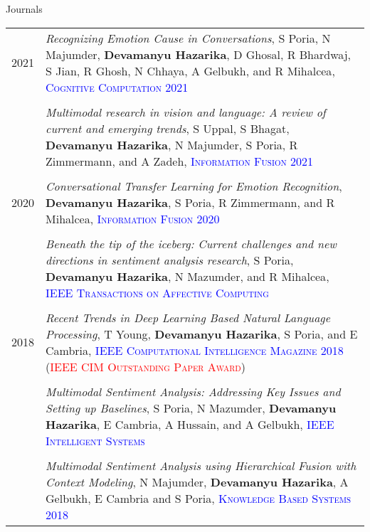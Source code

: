 \documentclass[a4paper,10pt]{article}
\begin{document}
Journals

\begin{tabular}{R{1cm}| L{12cm}}

    2021 & \textit{Recognizing Emotion Cause in Conversations}, \small{S Poria, N Majumder, \textbf{Devamanyu Hazarika}, D Ghosal, R Bhardwaj, S Jian, R Ghosh, N Chhaya, A Gelbukh, and R Mihalcea}, \textcolor{blue}{\textsc{Cognitive Computation 2021}}\\
    \\
    & \textit{Multimodal research in vision and language: A review of current and emerging trends}, \small{S Uppal, S Bhagat, \textbf{Devamanyu Hazarika}, N Majumder, S Poria, R Zimmermann, and A Zadeh}, \textcolor{blue}{\textsc{Information Fusion 2021}}\\
    \\
    2020 & \textit{Conversational Transfer Learning for Emotion Recognition}, \small{\textbf{Devamanyu Hazarika}, S Poria, R Zimmermann, and R Mihalcea}, \textcolor{blue}{\textsc{Information Fusion 2020}}\\
    \\
    & \textit{Beneath the tip of the iceberg: Current challenges and new directions in sentiment analysis research}, \small{S Poria, \textbf{Devamanyu Hazarika}, N Mazumder, and R Mihalcea}, \textcolor{blue}{\textsc{IEEE Transactions on Affective Computing}}\\
    \\
    2018 & \textit{Recent Trends in Deep Learning Based Natural Language Processing}, \small{T Young, \textbf{Devamanyu Hazarika}, S Poria, and E Cambria}, \textcolor{blue}{\textsc{IEEE Computational Intelligence Magazine 2018}} (\textcolor{red}{\textsc{IEEE CIM Outstanding Paper Award}}) \\
    \\
    & \textit{Multimodal Sentiment Analysis: Addressing Key Issues and Setting up Baselines}, \small{S Poria, N Mazumder, \textbf{Devamanyu Hazarika}, E Cambria, A Hussain, and A Gelbukh}, \textcolor{blue}{\textsc{IEEE Intelligent Systems}}\\
    \\
    & \textit{Multimodal Sentiment Analysis using Hierarchical Fusion with Context Modeling}, \small{N Majumder, \textbf{Devamanyu Hazarika}, A Gelbukh, E Cambria and S Poria}, \textcolor{blue}{\textsc{Knowledge Based Systems 2018}}
\end{tabular}
    
\end{document}
